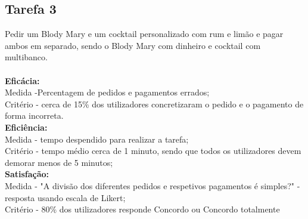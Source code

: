 \documentclass{article}
\begin{document}
\subsection*{Tarefa 3}
Pedir um Blody Mary e um cocktail personalizado com rum e limão e pagar ambos em separado, sendo o Blody Mary com dinheiro e cocktail com multibanco.\\\\
\textbf{Eficácia:}\\
Medida -Percentagem de pedidos e pagamentos errados;\\
Critério - cerca de 15\% dos utilizadores concretizaram o pedido e o pagamento de forma incorreta.\\
\textbf{Eficiência:}\\
Medida - tempo despendido para realizar a tarefa;\\
Critério - tempo médio cerca de 1 minuto, sendo que todos os utilizadores devem demorar menos de 5 minutos;\\
\textbf{Satisfação:}\\
Medida - "A divisão dos diferentes pedidos e respetivos pagamentos é simples?" - resposta usando escala de Likert;\\
Critério - 80\% dos utilizadores responde Concordo ou Concordo totalmente
\end{document}
